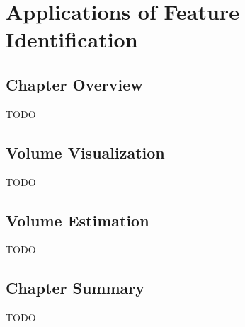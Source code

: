 \chapter{Applications of Feature Identification}
\label{chap:applications}

\section{Chapter Overview}

TODO

\section{Volume Visualization}

TODO

\section{Volume Estimation}

TODO

\section{Chapter Summary}

TODO
